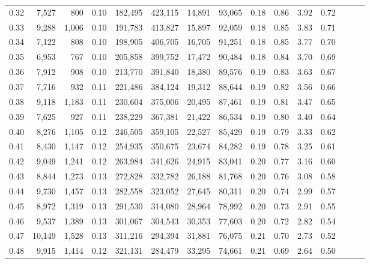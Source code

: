 \begin{tabular}{rrrrrrrrrrrrrrr}
0.32 &   7,527 &    800 &  0.10 &  182,495 &  423,115 &   14,891 &   93,065 &  0.18 &  0.86 &  3.92 &      0.72 \\
0.33 &   9,288 &  1,006 &  0.10 &  191,783 &  413,827 &   15,897 &   92,059 &  0.18 &  0.85 &  3.83 &      0.71 \\
0.34 &   7,122 &    808 &  0.10 &  198,905 &  406,705 &   16,705 &   91,251 &  0.18 &  0.85 &  3.77 &      0.70 \\
0.35 &   6,953 &    767 &  0.10 &  205,858 &  399,752 &   17,472 &   90,484 &  0.18 &  0.84 &  3.70 &      0.69 \\
0.36 &   7,912 &    908 &  0.10 &  213,770 &  391,840 &   18,380 &   89,576 &  0.19 &  0.83 &  3.63 &      0.67 \\
0.37 &   7,716 &    932 &  0.11 &  221,486 &  384,124 &   19,312 &   88,644 &  0.19 &  0.82 &  3.56 &      0.66 \\
0.38 &   9,118 &  1,183 &  0.11 &  230,604 &  375,006 &   20,495 &   87,461 &  0.19 &  0.81 &  3.47 &      0.65 \\
0.39 &   7,625 &    927 &  0.11 &  238,229 &  367,381 &   21,422 &   86,534 &  0.19 &  0.80 &  3.40 &      0.64 \\
0.40 &   8,276 &  1,105 &  0.12 &  246,505 &  359,105 &   22,527 &   85,429 &  0.19 &  0.79 &  3.33 &      0.62 \\
0.41 &   8,430 &  1,147 &  0.12 &  254,935 &  350,675 &   23,674 &   84,282 &  0.19 &  0.78 &  3.25 &      0.61 \\
0.42 &   9,049 &  1,241 &  0.12 &  263,984 &  341,626 &   24,915 &   83,041 &  0.20 &  0.77 &  3.16 &      0.60 \\
0.43 &   8,844 &  1,273 &  0.13 &  272,828 &  332,782 &   26,188 &   81,768 &  0.20 &  0.76 &  3.08 &      0.58 \\
0.44 &   9,730 &  1,457 &  0.13 &  282,558 &  323,052 &   27,645 &   80,311 &  0.20 &  0.74 &  2.99 &      0.57 \\
0.45 &   8,972 &  1,319 &  0.13 &  291,530 &  314,080 &   28,964 &   78,992 &  0.20 &  0.73 &  2.91 &      0.55 \\
0.46 &   9,537 &  1,389 &  0.13 &  301,067 &  304,543 &   30,353 &   77,603 &  0.20 &  0.72 &  2.82 &      0.54 \\
0.47 &  10,149 &  1,528 &  0.13 &  311,216 &  294,394 &   31,881 &   76,075 &  0.21 &  0.70 &  2.73 &      0.52 \\
0.48 &   9,915 &  1,414 &  0.12 &  321,131 &  284,479 &   33,295 &   74,661 &  0.21 &  0.69 &  2.64 &      0.50 \\

\end{tabular}
